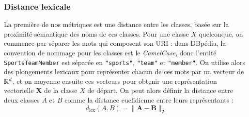 \subsubsection{Distance lexicale}

La première de nos métriques est une distance entre les classes, basée sur la proximité sémantique des noms de ces classes. Pour une classe $X$ quelconque, on commence par séparer les mots qui composent son URI : dans DBpédia, la convention de nommage pour les classes est le \textit{CamelCase}, donc l'entité \texttt{SportsTeamMember} est séparée en \texttt{"sports"}, \texttt{"team"} et \texttt{"member"}. On utilise alors des plongements lexicaux pour représenter chacun de ces mots par un vecteur de $\mathbb{R}^d$, et on moyenne ensuite ces vecteurs pour obtenir une représentation vectorielle $\mathbf{X}$ de la classe $X$ de départ. On peut alors définir la distance entre deux classes $A$ et $B$ comme la distance euclidienne entre leurs représentants :
\begin{equation}
d_\text{lex}(A, B) = \| \mathbf{A} - \mathbf{B} \|_2
\end{equation}


